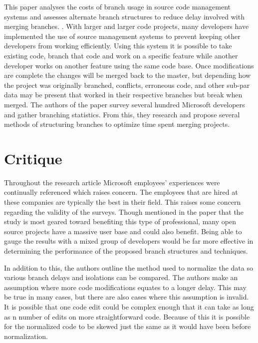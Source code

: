 \documentclass[11pt]{article}
\begin{document}
This paper analyses the costs of branch usage in source code management systems and assesses alternate branch structures to reduce delay involved with merging branches.
  \cite{Bird:2012:AVB:2393596.2393648}. With larger and larger code projects, many developers have implemented the use of source management systems to prevent keeping other developers from working efficiently. Using this system it is possible to take existing code, branch that code and work on a specific feature while another developer works on another feature using the same code base. Once modifications are complete the changes will be merged back to the master, but depending how the project was originally branched, conflicts, erroneous code, and other sub-par data may be present that worked in their respective branches but break when merged. The authors of the paper survey several hundred Microsoft developers and gather branching statistics. From this, they research and propose several methods of structuring branches to optimize time spent merging projects.

\vspace*{-.1in}
\section{Critique}
\label{sec:critique}
\vspace*{-.1in}

Throughout the research article Microsoft employees' experiences were continually referenced which raises concern. The employees that are hired at these companies are typically the best in their field. This raises some concern regarding the validity of the surveys. Though mentioned in the paper that the study is most geared toward benefiting this type of professional, many open source projects have a massive user base and could also benefit. Being able to gauge the results with a mixed group of developers would be far more effective in determining the performance of the proposed branch structures and techniques.

In addition to this, the authors outline the method used to normalize the data so various branch delays and isolations can be compared. The authors make an assumption where more code modifications equates to a longer delay. This may be true in many cases, but there are also cases where this assumption is invalid. It is possible that one code edit could be complex enough that it can take as long as n number of edits on more straightforward code. Because of this it is possible for the normalized code to be skewed just the same as it would have been before normalization.
\end{document}
